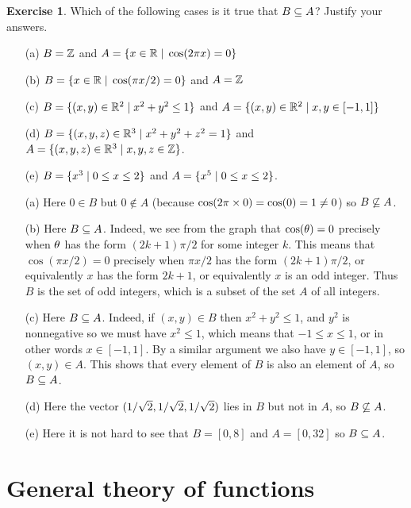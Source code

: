 \documentclass[a4paper]{book}
\theoremstyle{definition}
\newtheorem{exercise}[theorem]{Exercise}
\renewenvironment{solution}{\SolutionInline}{\endSolutionInline}
\begin{document}
\begin{exercise}
 Which of the following cases is it true that $B\subseteq A$?  Justify your
 answers. 
 \begin{itemize}
  \item[(a)] $B={\mathbb{Z}}$ and $A=\{x\in{\mathbb{R}}\;|\;\cos(2\pi x)=0\}$
  \item[(b)] $B=\{x\in{\mathbb{R}}\;|\;\cos(\pi x/2)=0\}$ and $A={\mathbb{Z}}$
  \item[(c)] $B=\{(x,y)\in{\mathbb{R}}^2\;|\; x^2+y^2\leq 1\}$ and
             $A=\{(x,y)\in{\mathbb{R}}^2\;|\; x,y\in[-1,1]\}$
  \item[(d)] $B=\{(x,y,z)\in{\mathbb{R}}^3\;|\; x^2+y^2+z^2=1\}$ and
             $A=\{(x,y,z)\in{\mathbb{R}}^3\;|\; x,y,z\in{\mathbb{Z}}\}$.
  \item[(e)] $B=\{x^3\;|\; 0\leq x\leq 2\}$ and 
             $A=\{x^5\;|\; 0\leq x\leq 2\}$.
 \end{itemize}
\end{exercise}
\begin{solution}
 \begin{itemize}
  \item[(a)] Here $0\in B$ but $0\not\in A$ (because
   $\cos(2\pi\times 0)=\cos(0)=1\neq 0$) so $B\not\subseteq A$.
  \item[(b)] Here $B\subseteq A$.  Indeed, we see from the graph that
   $\cos(\theta)=0$ precisely when $\theta$ has the form $(2k+1)\pi/2$ for
   some integer $k$.  This means that $\cos(\pi x/2)=0$ precisely when
   $\pi x/2$ has the form $(2k+1)\pi/2$, or equivalently $x$ has the
   form $2k+1$, or equivalently $x$ is an odd integer.  Thus $B$ is
   the set of odd integers, which is a subset of the set $A$ of all
   integers. 
  \item[(c)] Here $B\subseteq A$.  Indeed, if $(x,y)\in B$ then
   $x^2+y^2\leq 1$, and $y^2$ is nonnegative so we must have
   $x^2\leq 1$, which means that $-1\leq x\leq 1$, or in other words
   $x\in[-1,1]$.  By a similar argument we also have $y\in[-1,1]$, so
   $(x,y)\in A$.  This shows that every element of $B$ is also an
   element of $A$, so $B\subseteq A$.
  \item[(d)] Here the vector $(1/\sqrt{2},1/\sqrt{2},1/\sqrt{2})$ lies in $B$ but not
   in $A$, so $B\not\subseteq A$.
  \item[(e)] Here it is not hard to see that $B=[0,8]$ and $A=[0,32]$
   so $B\subseteq A$.
 \end{itemize}
\end{solution}

\chapter{General theory of functions}\label{chap-func}
\end{document}

